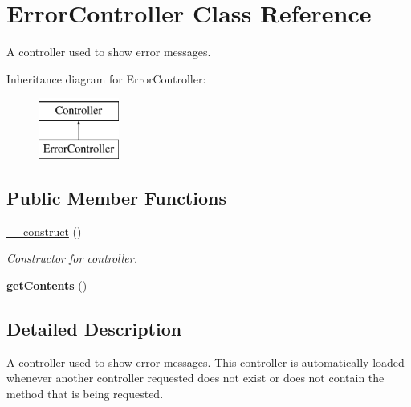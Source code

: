 \hypertarget{class_error_controller}{
\section{ErrorController Class Reference}
\label{class_error_controller}
}


A controller used to show error messages.  


Inheritance diagram for ErrorController:\begin{figure}[H]
\begin{center}
\leavevmode
\includegraphics[height=2.000000cm]{class_error_controller}
\end{center}
\end{figure}
\subsection*{Public Member Functions}
\begin{DoxyCompactItemize}
\item 
\hypertarget{class_error_controller_ae7b4198e73d3923153787afb39e84b2b}{
\hyperlink{class_error_controller_ae7b4198e73d3923153787afb39e84b2b}{\_\-\_\-construct} ()}
\label{class_error_controller_ae7b4198e73d3923153787afb39e84b2b}

\begin{DoxyCompactList}\small\item\em Constructor for controller. \item\end{DoxyCompactList}\item 
\hypertarget{class_error_controller_af210ff706dfb0413468c6a4fdadaf237}{
{\bfseries getContents} ()}
\label{class_error_controller_af210ff706dfb0413468c6a4fdadaf237}

\end{DoxyCompactItemize}


\subsection{Detailed Description}
A controller used to show error messages. This controller is automatically loaded whenever another controller requested does not exist or does not contain the method that is being requested.

